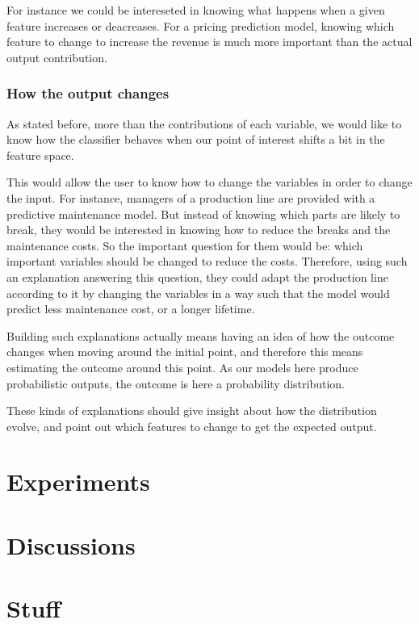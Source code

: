 \documentclass[a4paper,11pt]{kth-mag}
\begin{document}
For instance we could be intereseted in knowing what happens when a given feature increases or deacreases. For a pricing prediction model, knowing which feature to change to increase the revenue is much more important than the actual output contribution.

\subsection{How the output changes}

As stated before, more than the contributions of each variable, we would like to know how the classifier behaves when our point of interest shifts a bit in the feature space.

This would allow the user to know how to change the variables in order to change the input. For instance, managers of a production line are provided with a predictive maintenance model. But instead of knowing which parts are likely to break, they would be interested in knowing how to reduce the breaks and the maintenance costs. So the important question for them would be: which important variables should be changed to reduce the costs. Therefore, using such an explanation answering this question, they could adapt the production line  according to it by changing the variables in a way such that the model would predict less maintenance cost, or a longer lifetime.

Building such explanations actually means having an idea of how the outcome changes when moving around the initial point, and therefore this means estimating the outcome around this point. As our models here produce probabilistic outputs, the outcome is here a probability distribution.

These kinds of explanations should give insight about how the distribution evolve, and point out which features to change to get the expected output.

\chapter{Experiments}

\chapter{Discussions}




\chapter{Stuff}
\end{document}
